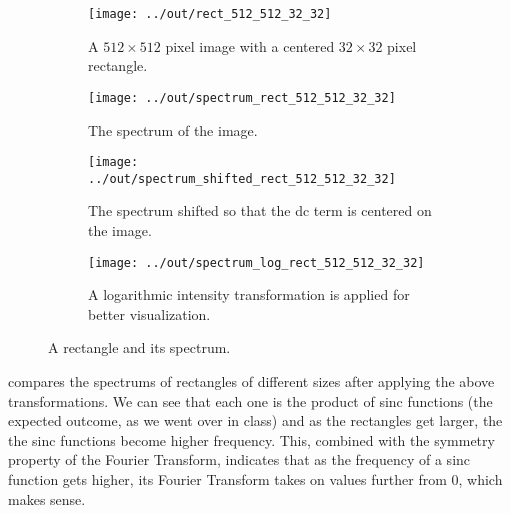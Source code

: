\documentclass[headings=optiontoheadandtoc,listof=totoc,parskip=full]{scrartcl}
\begin{document}
\begin{figure}[H]
	\centering
	\begin{subfigure}[t]{.22\textwidth}
		\centering
		\texttt{[image: ../out/rect\_512\_512\_32\_32]}
		\caption{A $512 \times 512$ pixel image with a centered $32 \times 32$ pixel rectangle.}
	\end{subfigure}
	\quad
	\begin{subfigure}[t]{.22\textwidth}
		\centering
		\texttt{[image: ../out/spectrum\_rect\_512\_512\_32\_32]}
		\caption{The spectrum of the image.}
		\label{fig:spectrum-unshifted}
	\end{subfigure}
	\quad
	\begin{subfigure}[t]{.22\textwidth}
		\centering
		\texttt{[image: ../out/spectrum\_shifted\_rect\_512\_512\_32\_32]}
		\caption{The spectrum shifted so that the dc term is centered on the image.}
		\label{fig:spectrum-shifted}
	\end{subfigure}
	\quad
	\begin{subfigure}[t]{.22\textwidth}
		\centering
		\texttt{[image: ../out/spectrum\_log\_rect\_512\_512\_32\_32]}
		\caption{A logarithmic intensity transformation is applied for better visualization.}
		\label{fig:spectrum-log}
	\end{subfigure}
	\caption{A rectangle and its spectrum.}
	\label{fig:rectangle-spectrum-steps}
\end{figure}

 compares the spectrums of rectangles of different sizes after applying the above transformations. We can see that each one is the product of sinc functions (the expected outcome, as we went over in class) and as the rectangles get larger, the the sinc functions become higher frequency. This, combined with the symmetry property of the Fourier Transform, indicates that as the frequency of a sinc function gets higher, its Fourier Transform takes on values further from 0, which makes sense.
\end{document}
